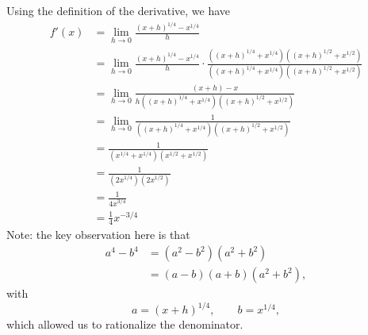 \documentclass{article}
\begin{document}
Using the definition of the derivative, we have
\begin{align*}
            f'(x)           &= \lim_{h\rightarrow 0}\frac{(x+h)^{1/4}-x^{1/4}}{h}   \\
                            &=  \lim_{h\rightarrow 0}\frac{(x+h)^{1/4}-x^{1/4}}{h}\cdot \frac{((x+h)^{1/4}+x^{1/4})((x+h)^{1/2}+x^{1/2})}{((x+h)^{1/4}+x^{1/4})((x+h)^{1/2}+x^{1/2})}\\
                            &=  \lim_{h\rightarrow 0}\frac{(x+h)-x}{h((x+h)^{1/4}+x^{1/4})((x+h)^{1/2}+x^{1/2})}    \\  
                            &=  \lim_{h\rightarrow 0}\frac{1}{((x+h)^{1/4}+x^{1/4})((x+h)^{1/2}+x^{1/2})}   \\
                            &= \frac{1}{(x^{1/4}+x^{1/4})(x^{1/2}+x^{1/2})} \\
                            &=  \frac{1}{(2x^{1/4})(2x^{1/2})}  \\
                            &=  \frac{1}{4x^{3/4}}  \\
                            &=  \frac{1}{4}x^{-3/4}
\end{align*}
Note: the key observation here is that
\begin{align*}
    a^4-b^4 &= (a^2-b^2)(a^2+b^2)   \\
        &= (a-b)(a+b)(a^2+b^2), 
\end{align*}
with 
\[
    a = (x+h)^{1/4}, \qquad b = x^{1/4},
\]
which allowed us to rationalize the denominator.
\end{document}
